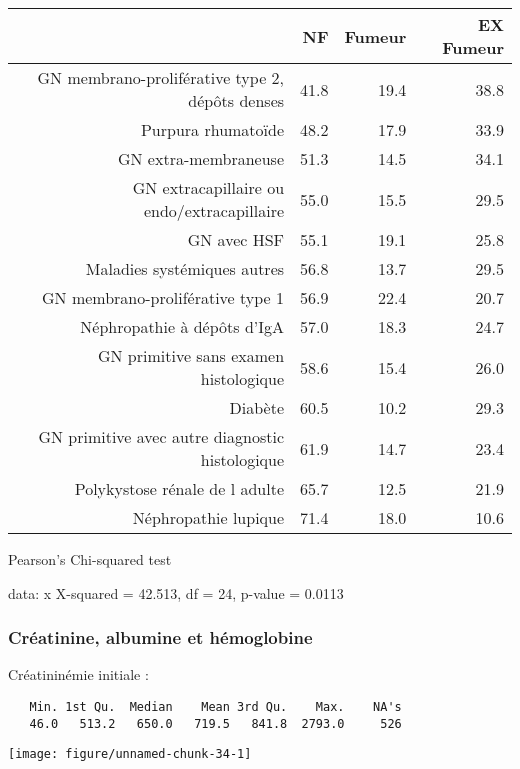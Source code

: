 \documentclass[11pt,a4paper]{article}\usepackage[]{graphicx}\usepackage[]{color}
\makeatletter
\def\maxwidth{ %
  \ifdim\Gin@nat@width>\linewidth
    \linewidth
  \else
    \Gin@nat@width
  \fi
}
\newenvironment{kframe}{%
 \def\at@end@of@kframe{}%
 \ifinner\ifhmode%
  \def\at@end@of@kframe{\end{minipage}}%
  \begin{minipage}{\columnwidth}%
 \fi\fi%
 \def\FrameCommand##1{\hskip\@totalleftmargin \hskip-\fboxsep
 \colorbox{shadecolor}{##1}\hskip-\fboxsep
     \hskip-\linewidth \hskip-\@totalleftmargin \hskip\columnwidth}%
 \MakeFramed {\advance\hsize-\width
   \@totalleftmargin\z@ \linewidth\hsize
   \@setminipage}}%
 {\par\unskip\endMakeFramed%
 \at@end@of@kframe}
\newenvironment{knitrout}{}{} %
\makeatother
\begin{document}
\begin{table}[H]
\centering
\begin{tabular}{rrrr}
  \hline
 & NF & Fumeur & EX Fumeur \\ 
  \hline
GN membrano-proliférative type 2, dépôts denses & 41.8 & 19.4 & 38.8 \\ 
  Purpura rhumatoïde & 48.2 & 17.9 & 33.9 \\ 
  GN extra-membraneuse & 51.3 & 14.5 & 34.1 \\ 
  GN extracapillaire ou endo/extracapillaire & 55.0 & 15.5 & 29.5 \\ 
  GN avec HSF & 55.1 & 19.1 & 25.8 \\ 
  Maladies systémiques autres & 56.8 & 13.7 & 29.5 \\ 
  GN membrano-proliférative type 1 & 56.9 & 22.4 & 20.7 \\ 
  Néphropathie à dépôts d'IgA & 57.0 & 18.3 & 24.7 \\ 
  GN primitive sans examen histologique & 58.6 & 15.4 & 26.0 \\ 
  Diabète & 60.5 & 10.2 & 29.3 \\ 
  GN primitive avec autre diagnostic histologique & 61.9 & 14.7 & 23.4 \\ 
  Polykystose rénale de l adulte & 65.7 & 12.5 & 21.9 \\ 
  Néphropathie lupique & 71.4 & 18.0 & 10.6 \\ 
   \hline
\end{tabular}
\end{table}

	Pearson's Chi-squared test

data:  x
X-squared = 42.513, df = 24, p-value = 0.0113



    \subsubsection{Créatinine, albumine et hémoglobine}

Créatininémie initiale :

\begin{knitrout}
\color{fgcolor}\begin{kframe}
\begin{verbatim}
   Min. 1st Qu.  Median    Mean 3rd Qu.    Max.    NA's 
   46.0   513.2   650.0   719.5   841.8  2793.0     526 
\end{verbatim}
\end{kframe}
\texttt{[image: figure/unnamed-chunk-34-1]} 

\end{knitrout}
\end{document}
